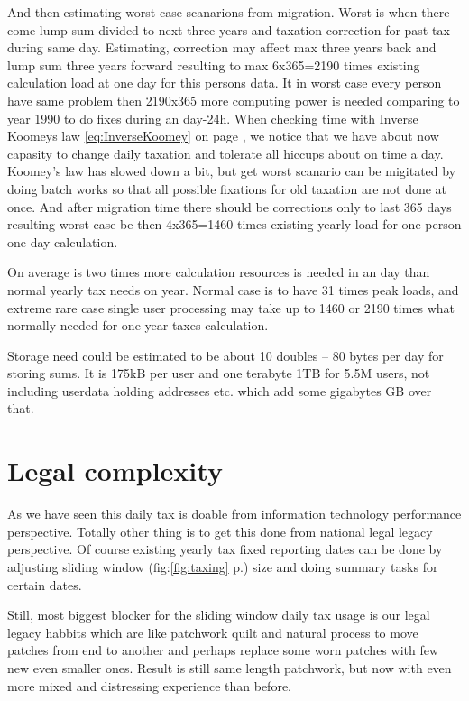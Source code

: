 And then estimating worst case scanarions from migration. Worst is when there
come lump sum divided to next three years and taxation correction for past tax
during same day. Estimating, correction may affect max three years back and
lump sum three years forward resulting to max 6x365=2190 times existing
calculation load at one day for this persons data. It in worst case every
person have same problem then 2190x365 more computing power is needed
comparing to year 1990 to do fixes during an day-24h. When checking time with
Inverse Koomeys law \ref{eq:InverseKoomey} on page \pageref{eq:InverseKoomey},
we notice that we have about now capasity to change daily taxation and tolerate
all hiccups about on time a day. Koomey's law has slowed down a bit, but get
worst scanario can be migitated by doing batch works so that all possible
fixations for old taxation are not done at once. And after migration time there
should be corrections only to last 365 days resulting worst case be then
4x365=1460 times existing yearly load for one person one day calculation.

On average is two times more calculation resources is needed in an day than
normal yearly tax needs on year. Normal case is to have 31 times peak loads,
and extreme rare case single user processing may take up to 1460 or 2190 times
what normally needed for one year taxes calculation.

Storage need could be estimated to be about 10 doubles -- 80 bytes per day for
storing sums. It is 175kB per user and one terabyte 1TB for 5.5M users, not
including userdata holding addresses etc. which add some gigabytes GB over
that.

\section{Legal complexity}
\label{legal_complexity}

As we have seen this daily tax is doable from information technology
performance perspective. Totally other thing is to get this done from national
legal legacy perspective. Of course existing yearly tax fixed reporting
dates can be done by adjusting sliding window (fig:\ref{fig:taxing} 
p.\pageref{fig:taxing}) size and doing summary tasks for certain dates.

Still, most biggest blocker for the sliding window daily tax usage is our
legal legacy habbits which are like patchwork quilt and natural process to
move patches from end to another and perhaps replace some worn patches with
few new even smaller ones. Result is still same length patchwork, but now with
even more mixed and distressing experience than before.

